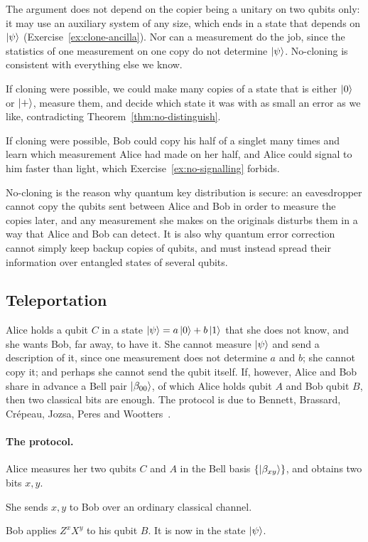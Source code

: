 The argument does not depend on the copier being a unitary on two qubits only: it may use an auxiliary system of any size, which ends in a state that depends on $\left|\psi\right\rangle$ (Exercise~\ref{ex:clone-ancilla}). Nor can a measurement do the job, since the statistics of one measurement on one copy do not determine $\left|\psi\right\rangle$. No-cloning is consistent with everything else we know.
\begin{steps}
  \item If cloning were possible, we could make many copies of a state that is either $\left|0\right\rangle$ or $\left|+\right\rangle$, measure them, and decide which state it was with as small an error as we like, contradicting Theorem~\ref{thm:no-distinguish}.
  \item If cloning were possible, Bob could copy his half of a singlet many times and learn which measurement Alice had made on her half, and Alice could signal to him faster than light, which Exercise~\ref{ex:no-signalling} forbids.
\end{steps}

\begin{lookahead}
  No-cloning is the reason why quantum key distribution is secure: an eavesdropper cannot copy the qubits sent between Alice and Bob in order to measure the copies later, and any measurement she makes on the originals disturbs them in a way that Alice and Bob can detect. It is also why quantum error correction cannot simply keep backup copies of qubits, and must instead spread their information over entangled states of several qubits.
\end{lookahead}

\subsection{Teleportation}

Alice holds a qubit $C$ in a state $\left|\psi\right\rangle=a\left|0\right\rangle+b\left|1\right\rangle$ that she does not know, and she wants Bob, far away, to have it. She cannot measure $\left|\psi\right\rangle$ and send a description of it, since one measurement does not determine $a$ and $b$; she cannot copy it; and perhaps she cannot send the qubit itself. If, however, Alice and Bob share in advance a Bell pair $\left|\beta_{00}\right\rangle$, of which Alice holds qubit $A$ and Bob qubit $B$, then two classical bits are enough. The protocol is due to Bennett, Brassard, Cr\'epeau, Jozsa, Peres and Wootters~\cite{bennett1993}.

\paragraph{The protocol.}
\begin{stepsn}
  \item Alice measures her two qubits $C$ and $A$ in the Bell basis $\{\left|\beta_{xy}\right\rangle\}$, and obtains two bits $x,y$.
  \item She sends $x,y$ to Bob over an ordinary classical channel.
  \item Bob applies $Z^xX^y$ to his qubit $B$. It is now in the state $\left|\psi\right\rangle$.
\end{stepsn}

